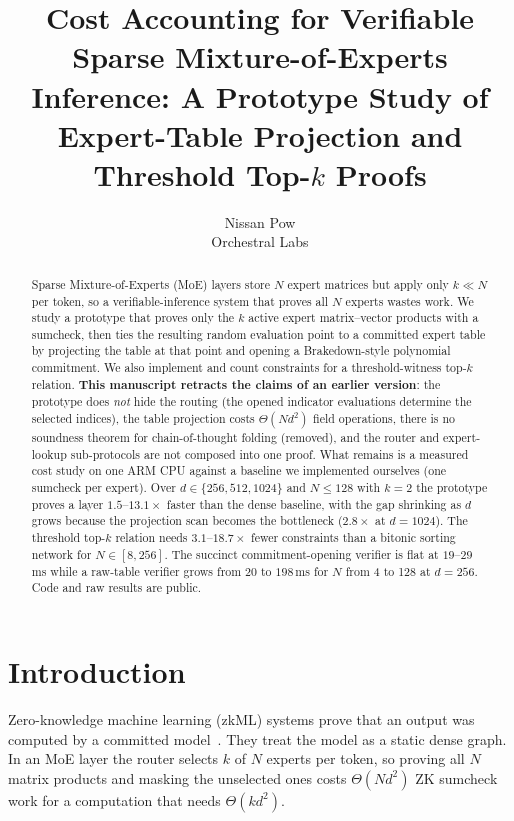 \documentclass[10pt,twocolumn]{article}
\title{\textbf{Cost Accounting for Verifiable Sparse Mixture-of-Experts Inference: A Prototype Study of Expert-Table Projection and Threshold Top-$k$ Proofs}}
\author{Nissan Pow \\ Orchestral Labs}
\date{}
\begin{document}
\maketitle

\begin{abstract}
Sparse Mixture-of-Experts (MoE) layers store $N$ expert matrices but apply only $k \ll N$ per token, so a verifiable-inference system that proves all $N$ experts wastes work. We study a prototype that proves only the $k$ active expert matrix--vector products with a sumcheck, then ties the resulting random evaluation point to a committed expert table by projecting the table at that point and opening a Brakedown-style polynomial commitment. We also implement and count constraints for a threshold-witness top-$k$ relation. \textbf{This manuscript retracts the claims of an earlier version}: the prototype does \emph{not} hide the routing (the opened indicator evaluations determine the selected indices), the table projection costs $\Theta(Nd^2)$ field operations, there is no soundness theorem for chain-of-thought folding (removed), and the router and expert-lookup sub-protocols are not composed into one proof. What remains is a measured cost study on one ARM CPU against a baseline we implemented ourselves (one sumcheck per expert). Over $d \in \{256,512,1024\}$ and $N \le 128$ with $k=2$ the prototype proves a layer $1.5$--$13.1\times$ faster than the dense baseline, with the gap shrinking as $d$ grows because the projection scan becomes the bottleneck ($2.8\times$ at $d=1024$). The threshold top-$k$ relation needs $3.1$--$18.7\times$ fewer constraints than a bitonic sorting network for $N \in [8,256]$. The succinct commitment-opening verifier is flat at $19$--$29$\,ms while a raw-table verifier grows from $20$ to $198$\,ms for $N$ from 4 to 128 at $d=256$. Code and raw results are public.
\end{abstract}

\section{Introduction}
Zero-knowledge machine learning (zkML) systems prove that an output was computed by a committed model~\cite{kang2022scaling,chen2024zkml,sun2024zkllm}. They treat the model as a static dense graph. In an MoE layer the router selects $k$ of $N$ experts per token, so proving all $N$ matrix products and masking the unselected ones costs $\Theta(Nd^2)$ ZK sumcheck work for a computation that needs $\Theta(kd^2)$.
\end{document}
